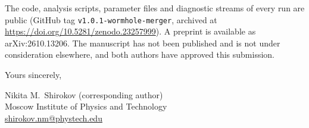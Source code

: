 \documentclass[11pt]{article}
\begin{document}
The code, analysis scripts, parameter files and diagnostic streams of every run are public (GitHub tag \texttt{v1.0.1-wormhole-merger}, archived at \url{https://doi.org/10.5281/zenodo.23257999}). A preprint is available as arXiv:2610.13206. The manuscript has not been published and is not under consideration elsewhere, and both authors have approved this submission.

Yours sincerely,

Nikita M.\ Shirokov (corresponding author)\\
Moscow Institute of Physics and Technology\\
\href{mailto:shirokov.nm@phystech.edu}{shirokov.nm@phystech.edu}
\end{document}
